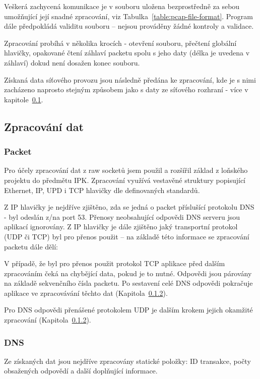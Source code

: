 \documentclass[11pt]{article}
\begin{document}
	Veškerá zachycená komunikace je v souboru uložena bezprostředně za sebou umožňující její snadné zpracování, viz Tabulka~\ref{table:pcap-file-format}.
	Program dále předpokládá validitu souboru -- nejsou prováděny žádné kontroly a validace.
	
	Zpracování probíhá v několika krocích - otevření souboru, přečtení globální hlavičky, opakované čtení záhlaví packetu spolu s jeho daty (délka je uvedena v záhlaví) dokud není dosažen konec souboru.
	
	Získaná data síťového provozu jsou následně předána ke zpracování, kde je s nimi zacházeno naprosto stejným způsobem jako s daty ze síťového rozhraní - více v kapitole~\ref{section:data-processing}.

	\subsection{Zpracování dat} \label{section:data-processing}
	\subsubsection{Packet} \label{section:data-processing:packet}
	Pro účely zpracování dat z raw socketů jsem použil a rozšířil základ z loňského projektu do předmětu IPK. Zpracování využívá vestavěné struktury popisující Ethernet, IP\cite{RFC0791}, UPD\cite{RFC0768} i TCP\cite{RFC0793} hlavičky dle definovaných standardů.
	
	Z IP hlavičky je nejdříve zjištěno, zda se jedná o packet příslušící protokolu DNS - byl odeslán z/na port \textsf{53}\cite{RFC1035}.
	Přenosy neobsahující odpovědi DNS serveru jsou aplikací ignorovány.
	Z IP hlavičky je dále zjištěno jaký transportní protokol (UDP či TCP) byl pro přenos použit -- na základě této informace se zpracování packetu dále dělí:
	
	V případě, že byl pro přenos použit protokol TCP aplikace před dalším zpracováním čeká na chybějící data, pokud je to nutné\cite{RFC7766}.
	Odpovědi jsou párovány na základě sekvenčního čísla packetu\cite{RFC0793}.
	Po sestavení celé DNS odpovědi pokračuje aplikace ve zpracovávání těchto dat (Kapitola~\ref{section:data-processing:dns}).
	
	Pro DNS odpovědi přenášené protokolem UDP je dalším krokem jejich okamžité zpracování (Kapitola~\ref{section:data-processing:dns}).
	
	\subsubsection{DNS} \label{section:data-processing:dns}
	Ze získaných dat jsou nejdříve zpracovány statické položky: ID transakce, počty obsažených odpovědí a další doplňující informace\cite{RFC1035}.
	
\end{document}
